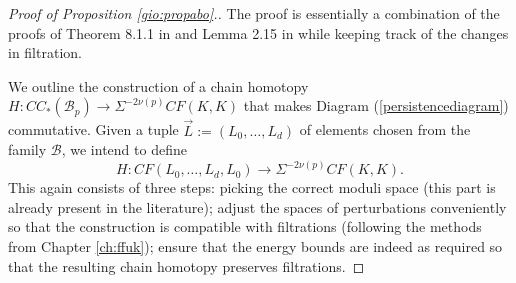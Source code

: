 \begin{proof}[Proof of Proposition \ref{gio:propabo}.]
The proof is essentially a combination of the proofs of Theorem 8.1.1 in \cite{Bi-Co:Yasha-fest} and Lemma 2.15 in \cite{she:fanofuk} while keeping track of the changes in filtration. 

We outline the construction of a chain homotopy $H\colon CC_*(\mathcal{B}_p)\to \Sigma^{-2\nu(p)}CF(K,K)$
that makes  Diagram (\ref{persistencediagram}) commutative. 
Given a tuple $\vec{L}:=(L_0,\ldots, L_d)$ of elements chosen from the family $\mathcal{B}$, we intend to define $$H\colon CF(L_0,\ldots, L_d,L_0)\to \Sigma^{-2\nu(p)}CF(K,K).$$ This again consists of three steps: picking the correct moduli space (this part is already present in the literature);
adjust the spaces of perturbations conveniently so that the construction is compatible with
filtrations (following the methods from Chapter \ref{ch:ffuk}); ensure that the energy bounds are
indeed as required so that the resulting chain homotopy preserves filtrations.





\end{proof}
